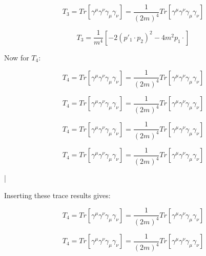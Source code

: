 \documentclass[a4]{article}
\begin{document}
    \begin{equation}
        T_3 = Tr [\gamma^\mu \gamma^\nu \gamma_\mu \gamma_\nu] = \frac{1}{(2 m)^4} Tr [\gamma^\mu \gamma^\nu \gamma_\mu \gamma_\nu]
    \end{equation}

    \begin{framed}
        \begin{equation}
            T_3 = \frac{1}{m^4} [- 2 (p'_1 \cdot p_2)^2 - 4 m^2 p_1 \cdot]
        \end{equation}
    \end{framed}

    Now for $T_4$:

    \begin{equation}
        T_4 = Tr [\gamma^\mu \gamma^\nu \gamma_\mu \gamma_\nu] = \frac{1}{(2 m)^4} Tr [\gamma^\mu \gamma^\nu \gamma_\mu \gamma_\nu]
    \end{equation}

    \begin{equation}
        T_4 = Tr [\gamma^\mu \gamma^\nu \gamma_\mu \gamma_\nu] = \frac{1}{(2 m)^4} Tr [\gamma^\mu \gamma^\nu \gamma_\mu \gamma_\nu]
    \end{equation}

    \begin{equation}
        T_4 = Tr [\gamma^\mu \gamma^\nu \gamma_\mu \gamma_\nu] = \frac{1}{(2 m)^4} Tr [\gamma^\mu \gamma^\nu \gamma_\mu \gamma_\nu]
    \end{equation}

    \begin{equation}
        T_4 = Tr [\gamma^\mu \gamma^\nu \gamma_\mu \gamma_\nu] = \frac{1}{(2 m)^4} Tr [\gamma^\mu \gamma^\nu \gamma_\mu \gamma_\nu]
    \end{equation}

    \begin{framed}
        |
    \end{framed}


    Inserting these trace results gives:

    \begin{equation}
        T_4 = Tr [\gamma^\mu \gamma^\nu \gamma_\mu \gamma_\nu] = \frac{1}{(2 m)^4} Tr [\gamma^\mu \gamma^\nu \gamma_\mu \gamma_\nu]
    \end{equation}

    \begin{equation}
        T_4 = Tr [\gamma^\mu \gamma^\nu \gamma_\mu \gamma_\nu] = \frac{1}{(2 m)^4} Tr [\gamma^\mu \gamma^\nu \gamma_\mu \gamma_\nu]
    \end{equation}
\end{document}

